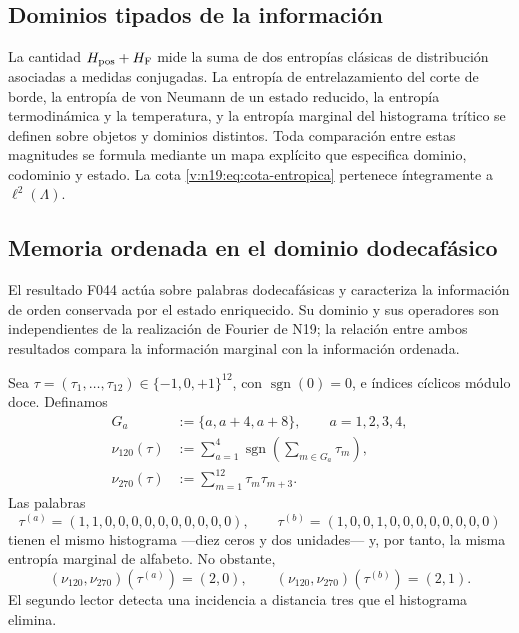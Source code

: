 \subsection{Dominios tipados de la información}
\label{v:n19:sec:tipos-entropia}

La cantidad \(H_{\rm pos}+H_{\rm F}\) mide la suma de dos entropías
clásicas de distribución asociadas a medidas conjugadas. La entropía de
entrelazamiento del corte de borde, la entropía de von Neumann de un
estado reducido, la entropía termodinámica y la temperatura, y la entropía
marginal del histograma trítico se definen sobre objetos y dominios
distintos. Toda comparación entre estas magnitudes se formula mediante un
mapa explícito que especifica dominio, codominio y estado. La cota
\eqref{v:n19:eq:cota-entropica} pertenece íntegramente a
\(\ell^2(\Lambda)\).

\subsection{Memoria ordenada en el dominio dodecafásico}
\label{v:n19:sec:memoria-ordenada}

El resultado F044 actúa sobre palabras dodecafásicas y caracteriza la
información de orden conservada por el estado enriquecido. Su dominio y
sus operadores son independientes de la realización de Fourier de N19;
la relación entre ambos resultados compara la información marginal con la
información ordenada.

Sea \(\tau=(\tau_1,\ldots,\tau_{12})\in\{-1,0,+1\}^{12}\), con
\(\operatorname{sgn}(0)=0\), e índices cíclicos módulo doce. Definamos
\begin{align}
 G_a&:=\{a,a+4,a+8\},\qquad a=1,2,3,4,\nonumber\\
 \nu_{120}(\tau)&:=\sum_{a=1}^4
   \operatorname{sgn}\!\left(\sum_{m\in G_a}\tau_m\right),
 \label{v:n19:eq:nu120}\\
 \nu_{270}(\tau)&:=\sum_{m=1}^{12}\tau_m\tau_{m+3}.
 \label{v:n19:eq:nu270}
\end{align}
Las palabras
\begin{equation}
 \tau^{(a)}=(1,1,0,0,0,0,0,0,0,0,0,0),\qquad
 \tau^{(b)}=(1,0,0,1,0,0,0,0,0,0,0,0)
 \label{v:n19:eq:testigos-orden}
\end{equation}
tienen el mismo histograma ---diez ceros y dos unidades--- y, por tanto,
la misma entropía marginal de alfabeto. No obstante,
\begin{equation}
 (\nu_{120},\nu_{270})(\tau^{(a)})=(2,0),\qquad
 (\nu_{120},\nu_{270})(\tau^{(b)})=(2,1).
 \label{v:n19:eq:testigos-lectura}
\end{equation}
El segundo lector detecta una incidencia a distancia tres que el
histograma elimina.

